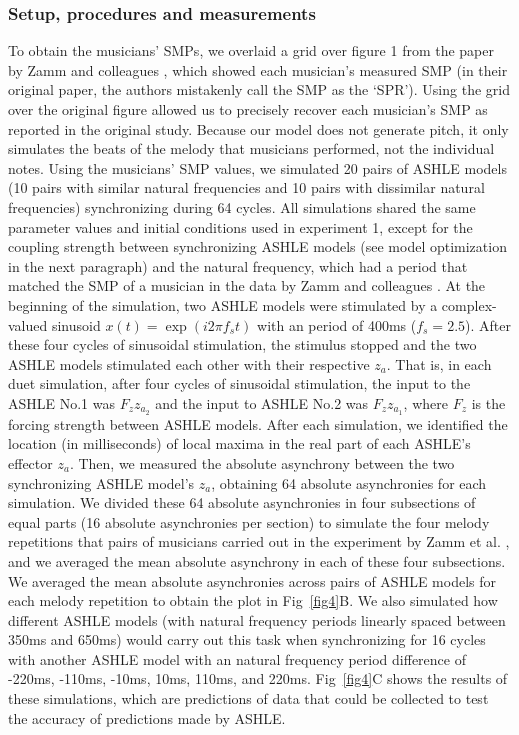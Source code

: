 \documentclass[10pt,letterpaper]{article}
\begin{document}
\subsubsection*{Setup, procedures and measurements}

To obtain the musicians' SMPs, we overlaid a grid over figure 1 from the paper by Zamm and colleagues \cite{zamm2016endogenous}, which showed each musician's measured SMP (in their original paper, the authors mistakenly call the SMP as the `SPR'). Using the grid over the original figure allowed us to precisely recover each musician's SMP as reported in the original study. Because our model does not generate pitch, it only simulates the beats of the melody that musicians performed, not the individual notes. Using the musicians' SMP values, we simulated 20 pairs of ASHLE models (10 pairs with similar natural frequencies and 10 pairs with dissimilar natural frequencies) synchronizing during 64 cycles. All simulations shared the same parameter values and initial conditions used in experiment 1, except for the coupling strength between synchronizing ASHLE models (see model optimization in the next paragraph) and the natural frequency, which had a period that matched the SMP of a musician in the data by Zamm and colleagues \cite{zamm2016endogenous}. At the beginning of the simulation, two ASHLE models were stimulated by a complex-valued sinusoid $x(t)=\exp(i2\pi  f_s t)$ with an period of 400ms ($f_s = 2.5$). After these four cycles of sinusoidal stimulation, the stimulus stopped and the two ASHLE models stimulated each other with their respective $z_a$. That is, in each duet simulation, after four cycles of sinusoidal stimulation, the input to the ASHLE No.1 was $F_z z_{a_2}$ and the input to ASHLE No.2 was $F_z z_{a_1}$, where $F_z$ is the forcing strength between ASHLE models. After each simulation, we identified the location (in milliseconds) of local maxima in the real part of each ASHLE's effector $z_a$. Then, we measured the absolute asynchrony between the two synchronizing ASHLE model's $z_a$, obtaining 64 absolute asynchronies for each simulation. We divided these 64 absolute asynchronies in four subsections of equal parts (16 absolute asynchronies per section) to simulate the four melody repetitions that pairs of musicians carried out in the experiment by Zamm et al. \cite{zamm2016endogenous}, and we averaged the mean absolute asynchrony in each of these four subsections. We averaged the mean absolute asynchronies across pairs of ASHLE models for each melody repetition to obtain the plot in Fig~\ref{fig4}B. We also simulated how different ASHLE models (with natural frequency periods linearly spaced between 350ms and 650ms) would carry out this task when synchronizing for 16 cycles with another ASHLE model with an natural frequency period difference of -220ms, -110ms, -10ms, 10ms, 110ms, and 220ms. Fig~\ref{fig4}C shows the results of these simulations, which are predictions of data that could be collected to test the accuracy of predictions made by ASHLE.
\end{document}
